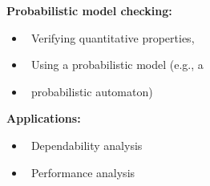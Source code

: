 \begin{block}{\large {}\vphantom{Introduction}}
\begin{columns}[t]
\begin{column}{.02\linewidth}\end{column}
\begin{column}{.52\linewidth}
\textbf{Probabilistic model checking: }
\begin{adjustwidth}{0.5cm}{0.5cm}
\begin{itemize}
\item \ Verifying \alert{quantitative properties},
\item \ Using a \alert{probabilistic} model (e.g., a 
\item[] \ probabilistic automaton) 
\end{itemize}
\end{adjustwidth}

\vskip15pt

\textbf{Applications:}
\begin{adjustwidth}{0.5cm}{0.5cm}
\begin{itemize}
\item \ \alert{Dependability analysis}
\item \ \alert{Performance analysis}
\end{itemize}
\end{adjustwidth}
%
\end{column}
\begin{column}{.42\linewidth}


\end{column}
\end{columns}
\end{block}
